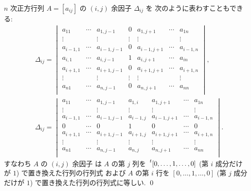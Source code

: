 \documentclass[12pt,twoside]{jarticle}
\begin{document}
\begin{question}[余因子の別の表現]
  \label{q:cofactor-pre-exp}
  $n$ 次正方行列 $A=[a_{ij}]$ の $(i,j)$ 余因子 $\Delta_{ij}$ を
  次のように表わすこともできる:
  {\small
  \begin{align*}
    &
    \Delta_{ij} = 
    \begin{vmatrix}
      a_{11}    & \cdots & a_{1,j-1}   &    0    & a_{1,j+1}   & \cdots & a_{1n} \\
      \vdots    &        & \vdots      & \vdots  & \vdots      &        & \vdots \\
      a_{i-1,1} & \cdots & a_{i-1,j-1} &    0    & a_{i-1,j+1} & \cdots & a_{i-1,n} \\
      a_{i,1}   & \cdots & a_{i,j-1}   &    1    & a_{i,j+1}   & \cdots & a_{in} \\
      a_{i+1,1} & \cdots & a_{i+1,j-1} &    0    & a_{i+1,j+1} & \cdots & a_{i+1,n} \\
      \vdots    &        & \vdots      & \vdots  & \vdots      &        & \vdots \\
      a_{n1}    & \cdots & a_{n,j-1}   &    0    & a_{n,j+1}   & \cdots & a_{nn} \\
    \end{vmatrix},
    \tag{1}
    \\ &
    \Delta_{ij} =
    \begin{vmatrix}
      a_{11}    & \cdots & a_{1,j-1}   & a_{1,i}   & a_{1,j+1}   & \cdots & a_{1n} \\
      \vdots    &        & \vdots      & \vdots    & \vdots      &        & \vdots \\
      a_{i-1,1} & \cdots & a_{i-1,j-1} & a_{i-1,j} & a_{i-1,j+1} & \cdots & a_{i-1,n} \\
         0      & \cdots &    0        &    1      &    0        & \cdots & 0 \\
      a_{i+1,1} & \cdots & a_{i+1,j-1} & a_{i+1,j} & a_{i+1,j+1} & \cdots & a_{i+1,n} \\
      \vdots    &        & \vdots      & \vdots    & \vdots      &        & \vdots \\
      a_{n1}    & \cdots & a_{n,j-1}   & a_{n,j}   & a_{n,j+1}   & \cdots & a_{nn} \\
    \end{vmatrix}.
    \tag{2}
  \end{align*}
  }すなわち $A$ の $(i,j)$ 余因子
  は $A$ の第 $j$ 列を $\tp{[0,\ldots,1,\ldots,0]}$ 
  (第 $i$ 成分だけが $1$) で置き換えた行列の行列式
  および $A$ の第 $i$ 行を $[0,\ldots,1,\ldots,0]$ 
  (第 $j$ 成分だけが $1$) で置き換えた行列の行列式に等しい.
  \qed
\end{question}
\end{document}
